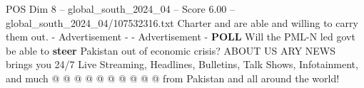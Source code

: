 \begin{textsample}{POS Dim 8 – global\_south\_2024\_04 – Score 6.00 – global\_south\_2024\_04/107532316.txt}
Charter and are able and willing to carry them out. - Advertisement - - Advertisement - \textbf{POLL} Will the PML-N led govt be able to \textbf{steer} Pakistan out of economic crisis?
ABOUT US ARY NEWS brings you 24/7 Live Streaming, Headlines, Bulletins, Talk Shows, Infotainment, and much @ @ @ @ @ @ @ @ @ @ from Pakistan and all around the world!

\end{textsample}
